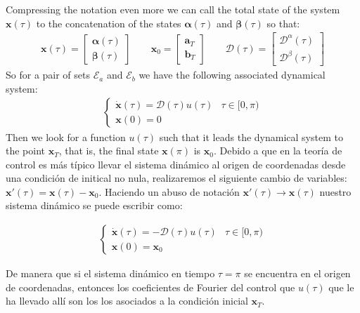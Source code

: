 Compressing the notation even more we can call the total state of the system $ \bm {x} (\tau) $ to the concatenation of the states $ \bm {\alpha} (\tau) $ and $ \bm {\beta} ( \tau) $ so that:
\begin{gather}
    \bm{x}(\tau) = \begin{bmatrix}
        \bm{\alpha}(\tau) \\  \bm{\beta}(\tau)
    \end{bmatrix} \hspace{2em}
    \bm{x}_0 = \begin{bmatrix}
        \bm{a}_T \\  \bm{b}_T
    \end{bmatrix} \hspace{2em}
    \bm{\mathcal{D}}(\tau) = \begin{bmatrix}
        \bm{\mathcal{D}}^\alpha(\tau) \\  
        \bm{\mathcal{D}}^\beta(\tau)
    \end{bmatrix}     
\end{gather}
So for a pair of sets $ \mathcal {E} _a $ and $ \mathcal {E} _b $ we have the following associated dynamical system:
\begin{gather}
    \begin{cases}
        \dot{\bm{x}}(\tau) = \bm{\mathcal{D}}(\tau) u(\tau)  & \tau \in [0,\pi)\\
        \bm{x}(0) = {0}
    \end{cases}
\end{gather}
Then we look for a function $ u (\tau) $ such that it leads the dynamical system to the point $ \bm {x} _T $, that is, the final state $ \bm {x} (\pi) $ is $ \bm {x}_0 $. Debido a que en la teoría de control es más típico llevar el sistema dinámico al origen de coordenadas desde una condición de initical no nula, realizaremos el siguiente cambio de variables: $\bm{x}'(\tau) = \bm{x}(\tau) - \bm{x}_0$. Haciendo un abuso de notación $\bm{x}'(\tau) \rightarrow \bm{x}(\tau)$  nuestro sistema dinámico se puede escribir como:

\begin{gather}
    \begin{cases}
        \dot{\bm{x}}(\tau) = -\bm{\mathcal{D}}(\tau) u(\tau)  & \tau \in [0,\pi)\\
        \bm{x}(0) = \bm{x}_0
    \end{cases}
\end{gather}

De manera que si el sistema dinámico en tiempo $\tau = \pi$ se encuentra en el origen de coordenadas, entonces los coeficientes de Fourier del control que $u(\tau)$ que le ha llevado allí son los los asociados a la condición inicial $\bm{x}_T$. 

